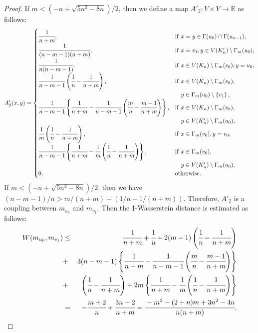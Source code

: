 \documentclass[leqno,12pt]{amsart} %
\theoremstyle{plain} %
\theoremstyle{definition} %
\begin{document}
\begin{proof}
If $m < (-n + \sqrt{5n^2 -8n})/2$, then we define a map $A'_2: V \times V \to \mathbb{R}$ as follows:
\begin{eqnarray*}
A'_2 (x, y)=
\begin{cases}
\cfrac{1}{n+m}, & \mathrm{if}\ x=y \in \Gamma(u_0) \cap \Gamma(u_{n-1}),\\
\cfrac{1}{(n-m-1)(n+m)}, & \mathrm{if}\ x=v_{1}, y \in V(K'_n) \setminus \Gamma_m (u_0),\\
\cfrac{1}{n(n-m-1)}, & \mathrm{if}\ x \in V(K_n) \setminus \Gamma_m (v_0), y = u_0,\\
\cfrac{1}{n-m-1} \left( \cfrac{1}{n} - \cfrac{1}{n+m} \right), & \mathrm{if}\ x \in V(K_n) \setminus \Gamma_m (v_0),\\ &\ \ \ y \in \Gamma_m (u_0) \setminus \left\{ v_1 \right\},\\
\cfrac{1}{n-m-1} \left\{ \cfrac{1}{n+m} - \cfrac{1}{n-m-1} \left( \cfrac{m}{n} - \cfrac{m-1}{n+m} \right) \right\}, & \mathrm{if}\ x \in V(K_n) \setminus \Gamma_m (v_0),\\ &\ \ \  y \in V(K'_n) \setminus \Gamma_m (u_0),\\
\cfrac{1}{m} \left( \cfrac{1}{n} - \cfrac{1}{n+m} \right), & \mathrm{if}\ x \in \Gamma_m (v_0), y= v_0,\\
\cfrac{1}{n-m-1} \left\{ \cfrac{1}{n+m} - \cfrac{1}{m} \left( \cfrac{1}{n} - \cfrac{1}{n+m} \right) \right\}, & \mathrm{if}\ x \in \Gamma_m (v_0),\\ &\ \ \ y \in V(K'_n) \setminus \Gamma_m (u_0),\\
0, & \mathrm{otherwise}.
\end{cases}
\end{eqnarray*}
If $m < (-n + \sqrt{5n^2 -8n})/2$, then we have $(n-m-1)/n > m/(n+m) - (1/n - 1/(n+m))$. Therefore, $A'_2$ is a coupling between $m_{u_0}$ and $m_{v_1}$. Then the 1-Wasserstein distance is estimated as follows: 
\begin{eqnarray*}
W(m_{u_0}, m_{v_1}) &\leq& \cfrac{1}{n+m} +\cfrac{1}{n}+2(m-1) \left( \cfrac{1}{n} - \cfrac{1}{n+m} \right) \\
&+& 3(n-m-1) \left\{ \cfrac{1}{n+m} - \cfrac{1}{n-m-1} \left( \cfrac{m}{n} - \cfrac{m-1}{n+m} \right) \right\}\\
&+& \left( \cfrac{1}{n} - \cfrac{1}{n+m}\right) +2m \left\{ \cfrac{1}{n+m} - \cfrac{1}{m} \left( \cfrac{1}{n} - \cfrac{1}{n+m} \right) \right\} \\
&=& - \cfrac{m+2}{n} +\cfrac{3n-2}{n+m} = \cfrac{-m^2 - (2+n)m +3n^2 -4n}{n(n+m)}.
\end{eqnarray*}

\end{proof}
\end{document}
